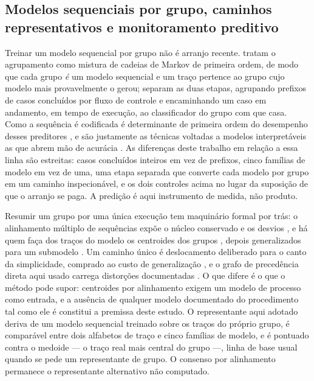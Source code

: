 \subsection{Modelos sequenciais por grupo, caminhos representativos e monitoramento preditivo}
\label{sec:rev-sequencia}

Treinar um modelo sequencial por grupo não é arranjo recente. 
tratam o agrupamento como mistura de cadeias de Markov de primeira ordem, de modo que cada grupo
\emph{é} um modelo sequencial e um traço pertence ao grupo cujo modelo mais provavelmente o gerou;
 separam as duas etapas, agrupando prefixos de casos
concluídos por fluxo de controle e encaminhando um caso em andamento, em tempo de execução, ao
classificador do grupo com que casa. Como a sequência é codificada é determinante de primeira ordem
do desempenho desses preditores \cite{teinemaa2019outcome}, e são justamente as técnicas voltadas a
modelos interpretáveis as que abrem mão de acurácia \cite{tax2020interdisciplinary}. As diferenças
deste trabalho em relação a essa linha são estreitas: casos concluídos inteiros em vez de prefixos,
cinco famílias de modelo em vez de uma, uma etapa separada que converte cada modelo por grupo em um
caminho inspecionável, e os dois controles acima no lugar da suposição de que o arranjo se paga. A
predição é aqui instrumento de medida, não produto.

Resumir um grupo por uma única execução tem maquinário formal por trás: o alinhamento múltiplo de
sequências expõe o núcleo conservado e os desvios \cite{bose2012diagnostics}, e há quem faça dos
traços do modelo os centroides dos grupos \cite{chatain2017alignment}, depois generalizados para um
submodelo \cite{boltenhagen2021modelbased}. Um caminho único é deslocamento deliberado para o canto
da simplicidade, comprado ao custo de generalização \cite{buijs2014quality}, e o grafo de precedência
direta aqui usado carrega distorções documentadas \cite{vanderaalst2019dfg}. O que difere é o que o método pode supor: centroides por
alinhamento exigem um modelo de processo como entrada, e a ausência de qualquer modelo documentado
do procedimento tal como ele é constitui a premissa deste estudo. O representante aqui adotado
deriva de um modelo sequencial treinado sobre os traços do próprio grupo, é comparável entre dois
alfabetos de traço e cinco famílias de modelo, e é pontuado contra o medoide --- o traço real mais
central do grupo ---, linha de base usual quando se pede um representante de grupo. O consenso por
alinhamento permanece o representante alternativo não computado.

